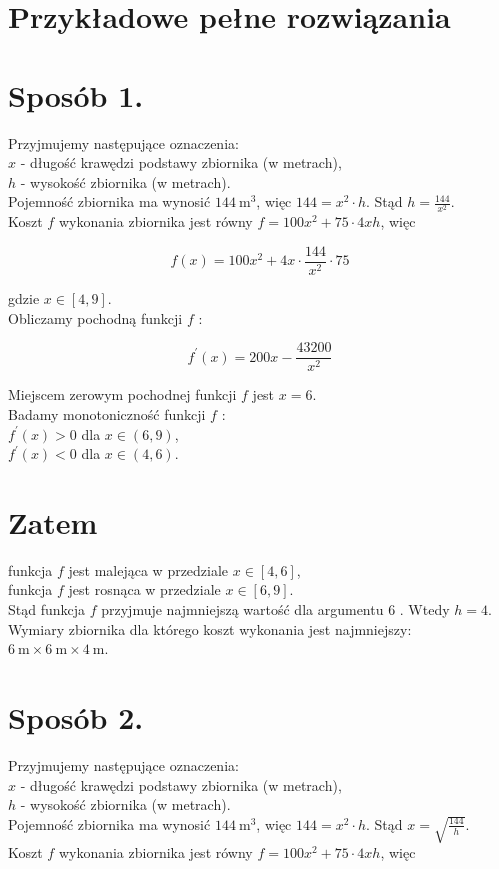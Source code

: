 \documentclass[10pt]{article}
\begin{document}
\section*{Przykładowe pełne rozwiązania}
\section*{Sposób 1.}
Przyjmujemy następujące oznaczenia:\\
$x$ - długość krawędzi podstawy zbiornika (w metrach),\\
$h$ - wysokość zbiornika (w metrach).\\
Pojemność zbiornika ma wynosić $144 \mathrm{~m}^{3}$, więc $144=x^{2} \cdot h$. Stąd $h=\frac{144}{x^{2}}$.\\
Koszt $f$ wykonania zbiornika jest równy $f=100 x^{2}+75 \cdot 4 x h$, więc

$$
f(x)=100 x^{2}+4 x \cdot \frac{144}{x^{2}} \cdot 75
$$

gdzie $x \in[4,9]$.\\
Obliczamy pochodną funkcji $f$ :

$$
f^{\prime}(x)=200 x-\frac{43200}{x^{2}}
$$

Miejscem zerowym pochodnej funkcji $f$ jest $x=6$.\\
Badamy monotoniczność funkcji $f$ :\\
$f^{\prime}(x)>0$ dla $x \in(6,9)$,\\
$f^{\prime}(x)<0$ dla $x \in(4,6)$.

\section*{Zatem}
funkcja $f$ jest malejąca w przedziale $x \in[4,6]$,\\
funkcja $f$ jest rosnąca w przedziale $x \in[6,9]$.\\
Stąd funkcja $f$ przyjmuje najmniejszą wartość dla argumentu 6 . Wtedy $h=4$.\\
Wymiary zbiornika dla którego koszt wykonania jest najmniejszy: $6 \mathrm{~m} \times 6 \mathrm{~m} \times 4 \mathrm{~m}$.

\section*{Sposób 2.}
Przyjmujemy następujące oznaczenia:\\
$x$ - długość krawędzi podstawy zbiornika (w metrach),\\
$h$ - wysokość zbiornika (w metrach).\\
Pojemność zbiornika ma wynosić $144 \mathrm{~m}^{3}$, więc $144=x^{2} \cdot h$. Stąd $x=\sqrt{\frac{144}{h}}$.\\
Koszt $f$ wykonania zbiornika jest równy $f=100 x^{2}+75 \cdot 4 x h$, więc
\end{document}
